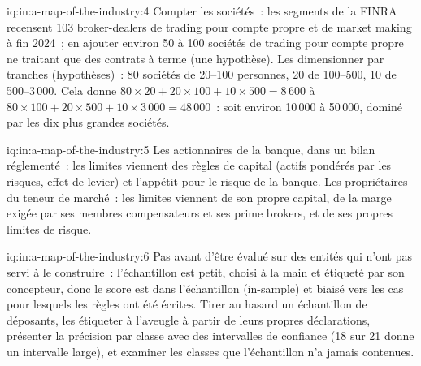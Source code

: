 \begin{solution}{iq:in:a-map-of-the-industry:4}
Compter les sociétés~: les segments de la FINRA recensent 103 broker-dealers de trading pour compte propre et de market making à fin 2024~; en ajouter
environ 50 à 100 sociétés de trading pour compte propre ne traitant que des contrats à terme (une hypothèse). Les dimensionner par tranches (hypothèses)~: 80 sociétés de 20--100
personnes, 20 de 100--500, 10 de 500--3\,000. Cela donne $80\times20+20\times100+10\times500=8\,600$ à
$80\times100+20\times500+10\times3\,000=48\,000$~: soit environ 10\,000 à 50\,000, dominé par les dix plus grandes sociétés.
\end{solution}

\begin{solution}{iq:in:a-map-of-the-industry:5}
Les actionnaires de la banque, dans un bilan réglementé~: les limites viennent des règles de capital (actifs pondérés par les risques,
effet de levier) et l'appétit pour le risque de la banque. Les propriétaires du teneur de marché~: les limites viennent de son propre capital, de la marge
exigée par ses membres compensateurs et ses prime brokers, et de ses propres limites de risque.
\end{solution}

\begin{solution}{iq:in:a-map-of-the-industry:6}
Pas avant d'être évalué sur des entités qui n'ont pas servi à le construire~: l'échantillon est petit, choisi à la main et étiqueté par son concepteur,
donc le score est dans l'échantillon (in-sample) et biaisé vers les cas pour lesquels les règles ont été écrites. Tirer au hasard un échantillon de déposants, les étiqueter
à l'aveugle à partir de leurs propres déclarations, présenter la précision par classe avec des intervalles de confiance (18 sur 21 donne un intervalle large), et examiner
les classes que l'échantillon n'a jamais contenues.
\end{solution}
